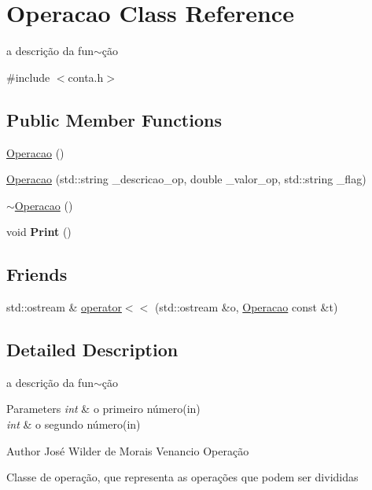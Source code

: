 \hypertarget{classOperacao}{}\section{Operacao Class Reference}
\label{classOperacao}


a descrição da fun$\sim$ção  




{\ttfamily \#include $<$conta.\+h$>$}

\subsection*{Public Member Functions}
\begin{DoxyCompactItemize}
\item 
\hyperlink{classOperacao_a5b55c96a9fecfd71058d629f42b575a6}{Operacao} ()
\item 
\hyperlink{classOperacao_a2d4fdd7e15aa3e9303229e1a920fb5b7}{Operacao} (std\+::string \+\_\+descricao\+\_\+op, double \+\_\+valor\+\_\+op, std\+::string \+\_\+flag)
\item 
\hyperlink{classOperacao_add674776034c096c826fa008701f5f93}{$\sim$\+Operacao} ()
\item 
\mbox{\label{classOperacao_aea6639cb1df845bb6ea3f3b8f4dfbfc6}} 
void {\bfseries Print} ()
\end{DoxyCompactItemize}
\subsection*{Friends}
\begin{DoxyCompactItemize}
\item 
std\+::ostream \& \hyperlink{classOperacao_a0671d43dc7d8405c6c76a9238b13217b}{operator$<$$<$} (std\+::ostream \&o, \hyperlink{classOperacao}{Operacao} const \&t)
\end{DoxyCompactItemize}


\subsection{Detailed Description}
a descrição da fun$\sim$ção 


\begin{DoxyParams}{Parameters}
{\em int} & o primeiro número(in) \\
\hline
{\em int} & o segundo número(in) \\
\hline
\end{DoxyParams}
\begin{DoxyAuthor}{Author}
José Wilder de Morais Venancio Operação
\end{DoxyAuthor}
Classe de operação, que representa as operações que podem ser divididas

